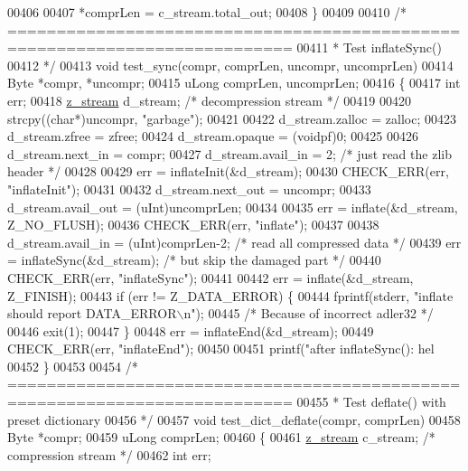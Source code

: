 \begin{DoxyCode}
{{{{{{{{{{{{{00406 
00407     *comprLen = c\_stream.total\_out;
00408 \}
00409 
00410 \textcolor{comment}{/* ===========================================================================}
00411 \textcolor{comment}{ * Test inflateSync()}
00412 \textcolor{comment}{ */}
00413 \textcolor{keywordtype}{void} test\_sync(compr, comprLen, uncompr, uncomprLen)
00414     Byte *compr, *uncompr;
00415     uLong comprLen, uncomprLen;
00416 \{
00417     \textcolor{keywordtype}{int} err;
00418     \hyperlink{structz__stream__s}{z\_stream} d\_stream; \textcolor{comment}{/* decompression stream */}
00419 
00420     strcpy((\textcolor{keywordtype}{char}*)uncompr, \textcolor{stringliteral}{"garbage"});
00421 
00422     d\_stream.zalloc = zalloc;
00423     d\_stream.zfree = zfree;
00424     d\_stream.opaque = (voidpf)0;
00425 
00426     d\_stream.next\_in  = compr;
00427     d\_stream.avail\_in = 2; \textcolor{comment}{/* just read the zlib header */}
00428 
00429     err = inflateInit(&d\_stream);
00430     CHECK\_ERR(err, \textcolor{stringliteral}{"inflateInit"});
00431 
00432     d\_stream.next\_out = uncompr;
00433     d\_stream.avail\_out = (uInt)uncomprLen;
00434 
00435     err = inflate(&d\_stream, Z\_NO\_FLUSH);
00436     CHECK\_ERR(err, \textcolor{stringliteral}{"inflate"});
00437 
00438     d\_stream.avail\_in = (uInt)comprLen-2;   \textcolor{comment}{/* read all compressed data */}
00439     err = inflateSync(&d\_stream);           \textcolor{comment}{/* but skip the damaged part */}
00440     CHECK\_ERR(err, \textcolor{stringliteral}{"inflateSync"});
00441 
00442     err = inflate(&d\_stream, Z\_FINISH);
00443     \textcolor{keywordflow}{if} (err != Z\_DATA\_ERROR) \{
00444         fprintf(stderr, \textcolor{stringliteral}{"inflate should report DATA\_ERROR\(\backslash\)n"});
00445         \textcolor{comment}{/* Because of incorrect adler32 */}
00446         exit(1);
00447     \}
00448     err = inflateEnd(&d\_stream);
00449     CHECK\_ERR(err, \textcolor{stringliteral}{"inflateEnd"});
00450 
00451     printf(\textcolor{stringliteral}{"after inflateSync(): hel%
00452 \}
00453 
00454 \textcolor{comment}{/* ===========================================================================}
00455 \textcolor{comment}{ * Test deflate() with preset dictionary}
00456 \textcolor{comment}{ */}
00457 \textcolor{keywordtype}{void} test\_dict\_deflate(compr, comprLen)
00458     Byte *compr;
00459     uLong comprLen;
00460 \{
00461     \hyperlink{structz__stream__s}{z\_stream} c\_stream; \textcolor{comment}{/* compression stream */}
00462     \textcolor{keywordtype}{int} err;
}}}}}}}}}}}}}}
\end{DoxyCode}
